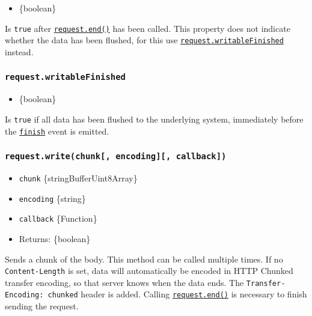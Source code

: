 \begin{itemize}
\tightlist
\item
  \{boolean\}
\end{itemize}

Is \texttt{true} after
\hyperref[requestenddata-encoding-callback]{\texttt{request.end()}} has
been called. This property does not indicate whether the data has been
flushed, for this use
\hyperref[requestwritablefinished]{\texttt{request.writableFinished}}
instead.

\subsubsection{\texorpdfstring{\texttt{request.writableFinished}}{request.writableFinished}}\label{request.writablefinished}

\begin{itemize}
\tightlist
\item
  \{boolean\}
\end{itemize}

Is \texttt{true} if all data has been flushed to the underlying system,
immediately before the
\hyperref[event-finish]{\texttt{\textquotesingle{}finish\textquotesingle{}}}
event is emitted.

\subsubsection{\texorpdfstring{\texttt{request.write(chunk{[},\ encoding{]}{[},\ callback{]})}}{request.write(chunk{[}, encoding{]}{[}, callback{]})}}\label{request.writechunk-encoding-callback}

\begin{itemize}
\tightlist
\item
  \texttt{chunk} \{string\textbar Buffer\textbar Uint8Array\}
\item
  \texttt{encoding} \{string\}
\item
  \texttt{callback} \{Function\}
\item
  Returns: \{boolean\}
\end{itemize}

Sends a chunk of the body. This method can be called multiple times. If
no \texttt{Content-Length} is set, data will automatically be encoded in
HTTP Chunked transfer encoding, so that server knows when the data ends.
The \texttt{Transfer-Encoding:\ chunked} header is added. Calling
\hyperref[requestenddata-encoding-callback]{\texttt{request.end()}} is
necessary to finish sending the request.

